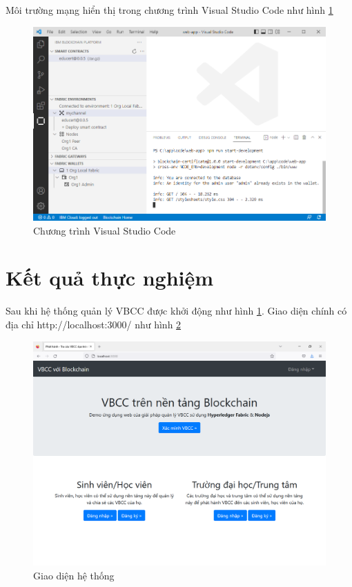 Môi trường mạng hiển thị trong chương trình Visual Studio Code như hình \ref{fig:ide_start}
\begin{figure}[htbp]
\centering
\includegraphics[width=.9\linewidth]{img/ide_start.PNG}
\caption{Chương trình Visual Studio Code}
\label{fig:ide_start}
\end{figure}

\section{Kết quả thực nghiệm}

Sau khi hệ thống quản lý VBCC được khởi động như hình \ref{fig:ide_start}. Giao diện chính có địa chỉ http://localhost:3000/ như hình \ref{fig:main_vbcc}

\begin{figure}[htbp]
\centering
\includegraphics[width=.9\linewidth]{img/main_vbcc.png}
\caption{Giao diện hệ thống}
\label{fig:main_vbcc}
\end{figure}

